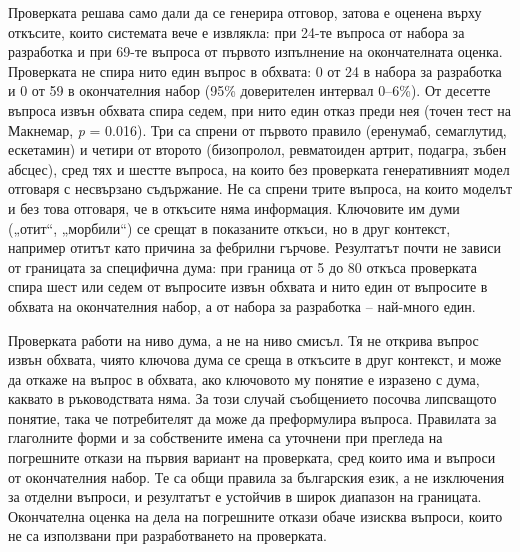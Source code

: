 \documentclass[12pt,a4paper]{article}
\makeatletter
\renewcommand\paragraph{\@startsection{paragraph}{4}{\z@}{1.5ex \@plus .5ex \@minus .2ex}{-1em}{\normalfont\normalsize\bfseries}}
\makeatother
\begin{document}
\paragraph{Оценка.} Проверката решава само дали да се генерира отговор, затова е оценена върху откъсите, които системата вече е извлякла: при 24-те въпроса от набора за разработка и при 69-те въпроса от първото изпълнение на окончателната оценка. Проверката не спира нито един въпрос в обхвата: 0 от 24 в набора за разработка и 0 от 59 в окончателния набор (95\% доверителен интервал 0--6\%). От десетте въпроса извън обхвата спира седем, при нито един отказ преди нея (точен тест на Макнемар, \textit{p} = 0.016). Три са спрени от първото правило (еренумаб, семаглутид, ескетамин) и четири от второто (бизопролол, ревматоиден артрит, подагра, зъбен абсцес), сред тях и шестте въпроса, на които без проверката генеративният модел отговаря с несвързано съдържание. Не са спрени трите въпроса, на които моделът и без това отговаря, че в откъсите няма информация. Ключовите им думи („отит“, „морбили“) се срещат в показаните откъси, но в друг контекст, например отитът като причина за фебрилни гърчове. Резултатът почти не зависи от границата за специфична дума: при граница от 5 до 80 откъса проверката спира шест или седем от въпросите извън обхвата и нито един от въпросите в обхвата на окончателния набор, а от набора за разработка -- най-много един.

\paragraph{Ограничения.} Проверката работи на ниво дума, а не на ниво смисъл. Тя не открива въпрос извън обхвата, чиято ключова дума се среща в откъсите в друг контекст, и може да откаже на въпрос в обхвата, ако ключовото му понятие е изразено с дума, каквато в ръководствата няма. За този случай съобщението посочва липсващото понятие, така че потребителят да може да преформулира въпроса. Правилата за глаголните форми и за собствените имена са уточнени при прегледа на погрешните откази на първия вариант на проверката, сред които има и въпроси от окончателния набор. Те са общи правила за българския език, а не изключения за отделни въпроси, и резултатът е устойчив в широк диапазон на границата. Окончателна оценка на дела на погрешните откази обаче изисква въпроси, които не са използвани при разработването на проверката.
\end{document}
